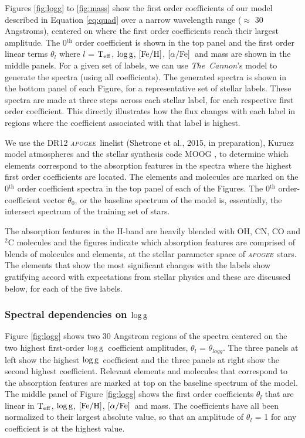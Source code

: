 \documentclass[12pt, preprint]{aastex}
\newcommand{\project}[1]{\textsl{#1}}
\newcommand{\tc}{\project{The~Cannon}}
\newcommand{\apogee}{\project{\textsc{apogee}}}
\newcommand{\teff}{\mbox{$\rm T_{eff}$}}
\newcommand{\feh}{\mbox{$\rm [Fe/H]$}}
\newcommand{\alphafe}{\mbox{$\rm [\alpha/Fe]$}}
\newcommand{\logg}{\mbox{$\rm \log g$}}
\begin{document}
Figures \ref{fig:logg} to \ref{fig:mass} show the first order coefficients of our model described in Equation \ref{eq:quad} over a narrow wavelength range ($\approx$ 30 Angstroms), centered on where the first order coefficients reach their largest amplitude. The 0$^{\mbox{th}}$ order coefficient is shown in the top panel and the first order linear terms $\theta_l$ where $l$ = \teff, \logg, \feh, \alphafe\ and mass are shown in the middle panels. For a given set of labels, we can use \tc's model to generate the spectra (using all coefficients). The generated spectra is shown in the bottom panel of each Figure, for a representative set of stellar labels. These spectra are made at three steps across each stellar label, for each respective first order coefficient. This directly illustrates how the flux changes with each label in regions where the coefficient associated with that label is highest.  

We use the DR12 \apogee\ linelist (Shetrone et al., 2015, in preparation), Kurucz model atmospheres \citep{castelli2004} and the stellar synthesis code MOOG \citep{sneden1979}, to determine which elements correspond to the absorption features in the spectra where the highest first order coefficients are located. The elements and molecules are marked on the 0$^{\mbox{th}}$ order coefficient spectra in the top panel of each of the Figures. The 0$^{\mbox{th}}$ order-coefficient vector $\theta_0$, or the baseline spectrum of the model is, essentially, the intersect spectrum of the training set of stars. 

The absorption features in the H-band are heavily blended with OH, CN, CO and $^2$C molecules and the figures indicate which absorption features are comprised of blends of molecules and elements, at the stellar parameter space of \apogee\ stars. The elements that show the most significant changes with the labels show gratifying accord with expectations from stellar physics and these are discussed below, for each of the five labels. 

\subsubsection{Spectral dependencies on \logg} 

Figure \ref{fig:logg} shows two 30 Angstrom regions of the spectra centered on the two highest first-order \logg\ coefficient amplitudes, $\theta_l$ = $\theta_{logg}$. The three panels at left show the highest \logg\ coefficient and the three panels at right show the second highest coefficient. Relevant elements and molecules that correspond to the absorption features are marked at top on the baseline spectrum of the model.  The middle panel of Figure \ref{fig:logg} shows the first order coefficients $\theta_l$ that are linear in \teff, \logg, \feh, \alphafe\ and mass. The coefficients have all been normalized to their largest absolute value, so that an amplitude of $\theta_l$ = 1 for any coefficient is at the highest value.  
\end{document}
